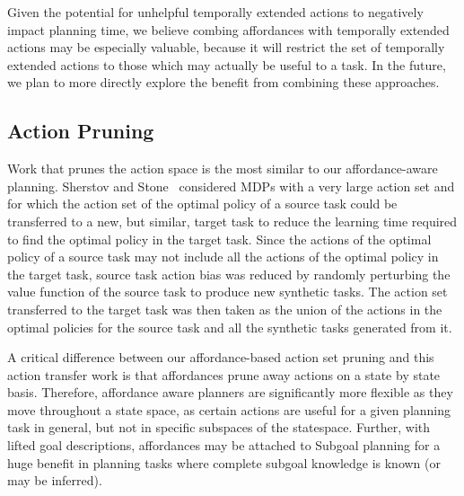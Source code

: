 \documentclass[]{article}
\newcommand{\jmnote}[1]{\textcolor{Green}{\textbf{JM: #1}}}
\begin{document}
Given the potential for unhelpful temporally extended actions to negatively impact planning time, we believe combing affordances with temporally extended actions
may be especially valuable, because it will restrict the set of temporally extended actions to those
which may actually be useful to a task. In the future, we plan to more directly explore the benefit from combining
these approaches.



\subsection{Action Pruning}

Work that prunes the action space is the most similar to our affordance-aware planning.
Sherstov and Stone~\cite{sherstov2005improving} considered MDPs with a very large action set and for which the action
set of the optimal policy of a source task could be transferred to a new, but similar, target
task to reduce the learning time required to find the optimal policy in the target task. Since the actions
of the optimal policy of a source task may not include all the actions of the optimal policy
in the target task, source task action bias was reduced by randomly perturbing the value function
of the source task to produce new synthetic tasks. The action set transferred to the target task
was then taken as the union of the actions in the optimal policies for the source task and all the
synthetic tasks generated from it.

A critical difference between our affordance-based action set pruning and this action transfer
work is that affordances prune away actions on a state by state basis. Therefore, affordance aware
planners are significantly more flexible as they move throughout a state space, as certain actions
are useful for a given planning task in general, but not in specific subspaces of the statespace. Further,
with lifted goal descriptions, affordances may be attached to Subgoal planning for a huge
benefit in planning tasks where complete subgoal knowledge is known (or may be inferred).
\end{document}
